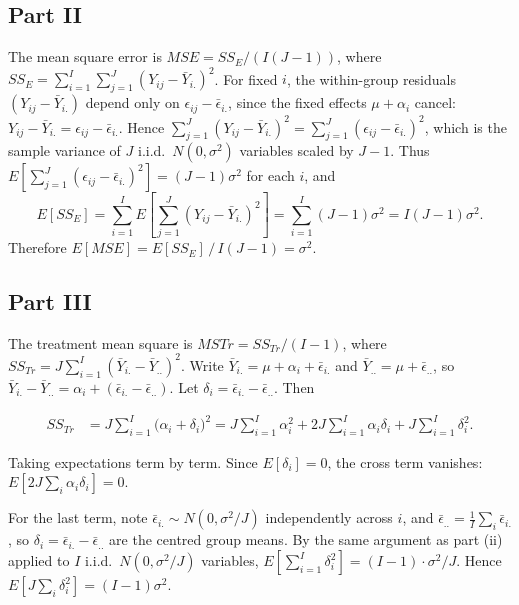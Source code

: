 \documentclass[letterpaper]{article}
\begin{document}
		\clearpage
		\subsection{Part II}
			The mean square error is $MSE = SS_E / (I(J-1))$, where
			$SS_E = \sum_{i=1}^I\sum_{j=1}^J (Y_{ij} - \bar{Y}_{i.})^2$.
			For fixed $i$, the within-group residuals $(Y_{ij} - \bar{Y}_{i.})$ depend only on
			$\epsilon_{ij} - \bar{\epsilon}_{i.}$, since the fixed effects $\mu + \alpha_i$ cancel:
			$Y_{ij} - \bar{Y}_{i.} = \epsilon_{ij} - \bar{\epsilon}_{i.}$.
			Hence $\sum_{j=1}^J (Y_{ij} - \bar{Y}_{i.})^2 = \sum_{j=1}^J (\epsilon_{ij} - \bar{\epsilon}_{i.})^2$,
			which is the sample variance of $J$ i.i.d.\ $N(0,\sigma^2)$ variables scaled by $J-1$.
			Thus $E\!\left[\sum_{j=1}^J(\epsilon_{ij}-\bar\epsilon_{i.})^2\right] = (J-1)\sigma^2$ for each $i$, and
			\[
			E[SS_E]
			= \sum_{i=1}^I E\!\left[\sum_{j=1}^J (Y_{ij}-\bar{Y}_{i.})^2\right]
			= \sum_{i=1}^I (J-1)\sigma^2
			= I(J-1)\sigma^2.
			\]
			Therefore $E[MSE] = E[SS_E]\,/\,I(J-1) = \sigma^2$. 
			
		\clearpage
		\subsection{Part III}
			The treatment mean square is $MSTr = SS_{Tr}/(I-1)$, where
			$SS_{Tr} = J\sum_{i=1}^I (\bar{Y}_{i.} - \bar{Y}_{..})^2$.
			Write $\bar{Y}_{i.} = \mu + \alpha_i + \bar{\epsilon}_{i.}$ and $\bar{Y}_{..} = \mu + \bar{\epsilon}_{..}$,
			so $\bar{Y}_{i.} - \bar{Y}_{..} = \alpha_i + (\bar{\epsilon}_{i.} - \bar{\epsilon}_{..})$.
			Let $\delta_i = \bar{\epsilon}_{i.} - \bar{\epsilon}_{..}$. Then
			
			\begin{align*}
				SS_{Tr}
				&= J\sum_{i=1}^I \bigl(\alpha_i + \delta_i\bigr)^2
				= J\sum_{i=1}^I \alpha_i^2
				+ 2J\sum_{i=1}^I \alpha_i\delta_i
				+ J\sum_{i=1}^I \delta_i^2.
			\end{align*}
			
			Taking expectations term by term. Since $E[\delta_i] = 0$, the cross term vanishes:
			$E\!\left[2J\sum_i \alpha_i\delta_i\right] = 0$.
			
			For the last term, note $\bar{\epsilon}_{i.} \sim N(0,\sigma^2/J)$ independently across $i$,
			and $\bar{\epsilon}_{..} = \frac{1}{I}\sum_i \bar{\epsilon}_{i.}$, so
			$\delta_i = \bar{\epsilon}_{i.} - \bar{\epsilon}_{..}$ are the centred group means.
			By the same argument as part (ii) applied to $I$ i.i.d.\ $N(0,\sigma^2/J)$ variables,
			$E\!\left[\sum_{i=1}^I \delta_i^2\right] = (I-1)\cdot\sigma^2/J$.
			Hence $E\!\left[J\sum_i \delta_i^2\right] = (I-1)\sigma^2$.
			
\end{document}
